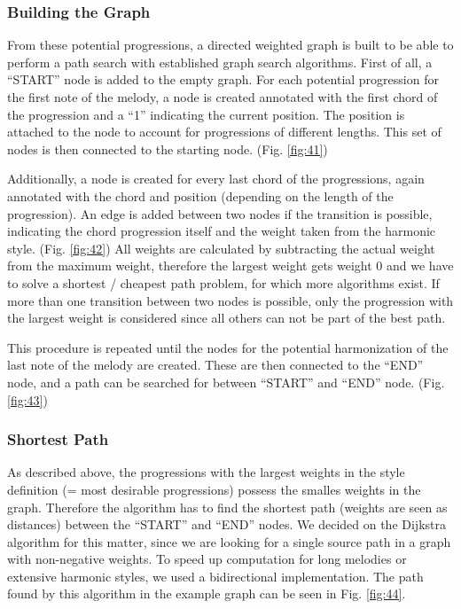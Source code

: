 \subsubsection{Building the Graph}
From these potential progressions, a directed weighted graph is built to be able to perform a path search with established graph search algorithms. First of all, a ``START'' node is added to the empty graph. For each potential progression for the first note of the melody, a node is created annotated with the first chord of the progression and a ``1'' indicating the current position. The position is attached to the node to account for progressions of different lengths. This set of nodes is then connected to the starting node. (Fig. \ref{fig:41})

Additionally, a node is created for every last chord of the progressions, again annotated with the chord and position (depending on the length of the progression). An edge is added between two nodes if the transition is possible, indicating the chord progression itself and the weight taken from the harmonic style. (Fig. \ref{fig:42}) All weights are calculated by subtracting the actual weight from the maximum weight, therefore the largest weight gets weight 0 and we have to solve a shortest / cheapest path problem, for which more algorithms exist. If more than one transition between two nodes is possible, only the progression with the largest weight is considered since all others can not be part of the best path.

This procedure is repeated until the nodes for the potential harmonization of the last note of the melody are created. These are then connected to the ``END'' node, and a path can be searched for between ``START'' and ``END'' node. (Fig. \ref{fig:43})


\subsubsection{Shortest Path}
As described above, the progressions with the largest weights in the style definition (= most desirable progressions) possess the smalles weights in the graph. Therefore the algorithm has to find the shortest path (weights are seen as distances) between the ``START'' and ``END'' nodes. We decided on the Dijkstra algorithm for this matter, since we are looking for a single source path in a graph with non-negative weights. To speed up computation for long melodies or extensive harmonic styles, we used a bidirectional implementation. The path found by this algorithm in the example graph can be seen in Fig. \ref{fig:44}.

